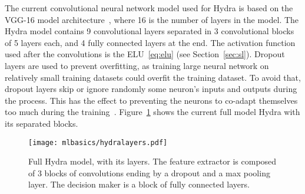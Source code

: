 The current convolutional neural network model used for Hydra is based on the VGG-16 model architecture~\cite{simonyan_very_2015}, where 16 is the number of layers in the model. The Hydra model contains 9 convolutional layers separated in 3 convolutional blocks of 5 layers each, and 4 fully connected layers at the end. The activation function used after the convolutions is the ELU~\eqref{eq:elu} (see Section~\ref{sec:sl}). Dropout layers are used to prevent overfitting, as training large neural network on relatively small training datasets could overfit the training dataset. To avoid that, dropout layers skip or ignore randomly some neuron's inputs and outputs during the process. This has the effect to preventing the neurons to co-adapt themselves too much during the training~\cite{srivastava_dropout_2014}. Figure~\ref{fig:hydralayers} shows the current full model Hydra with its separated blocks.
\begin{figure}[t!]
  \centering
  \texttt{[image: mlbasics/hydralayers.pdf]}
  \caption[Hydra layers]{Full Hydra model, with its layers. The feature extractor is composed of 3 blocks of convolutions ending by a dropout and a max pooling layer. The decision maker is a block of fully connected layers.}
  \label{fig:hydralayers}
\end{figure}
